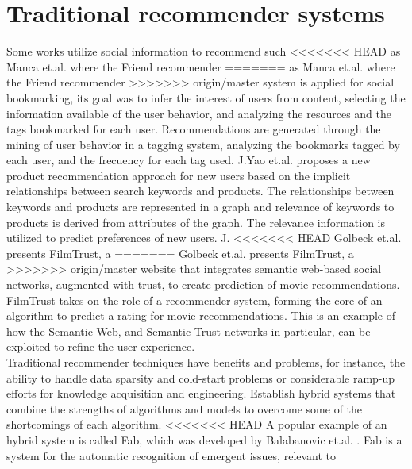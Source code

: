 \section{Traditional recommender systems} 
Some works utilize social information to recommend such
<<<<<<< HEAD
as Manca et.al. \cite{manca2014mining} where the Friend recommender
=======
as Manca et.al.\cite{manca2014mining} where the Friend recommender
>>>>>>> origin/master
system is applied for social bookmarking, its goal was to
infer the interest of users from content, selecting the 
information available of the user behavior, and analyzing the resources and the
tags bookmarked for each user. Recommendations are generated
through the mining of user behavior in a tagging system, analyzing the
bookmarks tagged by each user, and the frecuency for each tag used. 
J.Yao et.al. \cite{yao2012product} proposes a new product recommendation
approach for new users based on the implicit relationships between
search keywords and products. The relationships between keywords and
products are represented in a graph and relevance of keywords to
products is derived from attributes of the graph.
The relevance
information is utilized to predict preferences of new users. J.
<<<<<<< HEAD
Golbeck et.al. \cite{golbeck2006filmtrust} presents FilmTrust, a
=======
Golbeck et.al.\cite{golbeck2006filmtrust} presents FilmTrust, a
>>>>>>> origin/master
website that integrates semantic web-based social networks, augmented
with trust, to create prediction of movie recommendations. FilmTrust takes on
the role of a recommender system, forming the core of an algorithm to
predict a rating for movie recommendations. This is an example of
how the Semantic Web, and Semantic Trust networks in particular, can
be exploited to refine the user experience. \\  
Traditional recommender techniques have benefits and problems, for
instance, the ability to handle data sparsity and cold-start problems
or considerable ramp-up efforts for knowledge acquisition and
engineering. Establish hybrid systems that combine the strengths of
algorithms and models to overcome some of the shortcomings of
each algorithm.
<<<<<<< HEAD
A popular example of an hybrid system is called Fab, which was
developed by  Balabanovic et.al. \cite{balabanovic1997fab}. Fab is a
system  for the automatic recognition of emergent issues, relevant to
